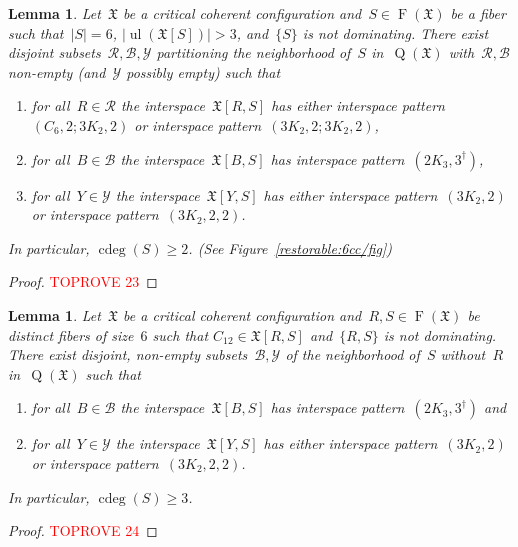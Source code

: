 \documentclass[english,a4paper]{article}
\theoremstyle{plain}
\newtheorem{lemma}      [theorem]{Lemma}
\theoremstyle{definition}
\newcommand{\abs}[1]{| #1 |}
\DeclareMathOperator{\Fibers}{F}
\newcommand{\coherentConfig}{\ensuremath{\mathfrak{X}}}
\newcommand{\fibers}[1]{\ensuremath{\Fibers \left( #1 \right)}}
\newcommand{\interspace}[2]{\ensuremath{\coherentConfig[#1,#2]}}
\newcommand{\inducedCC}[1]{\ensuremath{\coherentConfig[#1]}}
\DeclareMathOperator*{\ul}{ul}
\DeclareMathOperator*{\Quotient}{Q}
\newcommand{\quotientGraph}[1]{\ensuremath{\Quotient(#1)}}
\DeclareMathOperator{\ColorDeg}{cdeg}
\newcommand{\colorDeg}[1]{\ensuremath{\ColorDeg\left(#1\right)}}
\newcommand{\ipsixMatching}             {\ensuremath{(\disjointCliques{3}{2},2)}}
\newcommand{\ipsixMatchingTwice}        {\ensuremath{(\disjointCliques{3}{2},2,2)}}
\newcommand{\ipsixMatchingMatching}     {\ensuremath{(\disjointCliques{3}{2},2;\disjointCliques{3}{2},2)}}
\newcommand{\ipsixMatchingAndCycle}     {\ensuremath{(\cycle{6},2;\disjointCliques{3}{2},2)}}
\newcommand{\ipsixTriangle}               {\ensuremath{(\disjointCliques{2}{3},3^\dag)}}
\newcommand{\clique}[1]{\ensuremath{K_{#1}}}
\newcommand{\cycle}[1]{\ensuremath{C_{#1}}}
\newcommand{\disjointCliques}[2]{\ensuremath{#1 \clique{#2}}}
\begin{document}
\begin{lemma}
\label{critical:6-cc:restorable:large-neighborhood/lem}
    Let~$\coherentConfig$ be a critical coherent configuration and~$S \in \fibers{\coherentConfig}$ be a fiber such that~$\abs{S} = 6$, $\abs{\ul(\inducedCC{S})} > 3$, and~$\{S\}$ is not dominating.
    There exist disjoint subsets~$\mathcal{R},\mathcal{B}, \mathcal{Y}$ partitioning the neighborhood of~$S$ in~$\quotientGraph{\coherentConfig}$ with~$\mathcal{R},\mathcal{B}$ non-empty (and~$\mathcal{Y}$ possibly empty) such that
    \begin{enumerate}
        \item for all~$R \in \mathcal{R}$ the interspace~$\interspace{R}{S}$ has either interspace pattern~$\ipsixMatchingAndCycle$ or interspace pattern~$\ipsixMatchingMatching$,
        \item for all~$B \in \mathcal{B}$ the interspace~$\interspace{B}{S}$ has interspace pattern~$\ipsixTriangle$,
        \item for all~$Y \in \mathcal{Y}$ the interspace~$\interspace{Y}{S}$ has either interspace pattern~$\ipsixMatching$ or interspace pattern~$\ipsixMatchingTwice$.
    \end{enumerate}
    In particular, $\colorDeg{S} \geq 2$. (See Figure~\ref{restorable:6cc/fig})
\end{lemma}
\begin{proof}\textcolor{red}{TOPROVE 23}\end{proof}


\begin{lemma}
    \label{critical:6-cc:restorable:cycle/lem}
    Let~$\coherentConfig$ be a critical coherent configuration and~$R,S \in \fibers{\coherentConfig}$ be distinct fibers of size~$6$ such that $\cycle{12} \in \interspace{R}{S}$ and~$\{R,S\}$ is not dominating.
    There exist disjoint, non-empty subsets~$\mathcal{B}, \mathcal{Y}$ of the neighborhood of~$S$ without~$R$ in~$\quotientGraph{\coherentConfig}$ such that
    \begin{enumerate}
        \item for all~$B \in \mathcal{B}$ the interspace~$\interspace{B}{S}$ has interspace pattern~$\ipsixTriangle$ and
        \item for all~$Y \in \mathcal{Y}$ the interspace~$\interspace{Y}{S}$ has either interspace pattern~$\ipsixMatching$ or interspace pattern~$\ipsixMatchingTwice$.
    \end{enumerate}
    In particular, $\colorDeg{S} \geq 3$.
\end{lemma}
\begin{proof}\textcolor{red}{TOPROVE 24}\end{proof}
\end{document}
